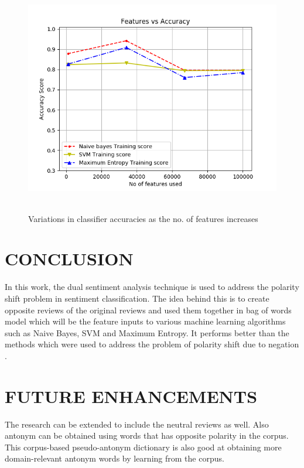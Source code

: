 \documentclass[oneside,a4paper,12pt]{pictreport}
\begin{document}
\begin{figure}[!h]
\includegraphics[width=5.0in,height=4.0in]{figure_1.png}
\caption{Variations in classifier accuracies as the no. of features increases}
\end{figure}



\chapter{CONCLUSION}
In this work, the dual sentiment analysis technique is used
to address the polarity shift problem in sentiment classification.
The idea behind this is to create opposite reviews of the
original reviews and used them together in bag of words model
which will be the feature inputs to various machine learning
algorithms such as Naive Bayes, SVM and Maximum Entropy. It
performs better than the methods which were used to address
the problem of polarity shift due to negation .

\chapter{FUTURE ENHANCEMENTS} 
The research can be extended to include the neutral reviews as well.
Also antonym can be obtained using words that has opposite polarity in the corpus.
This corpus-based pseudo-antonym dictionary is also good at obtaining
more domain-relevant antonym words by learning from the
corpus.
\end{document}
